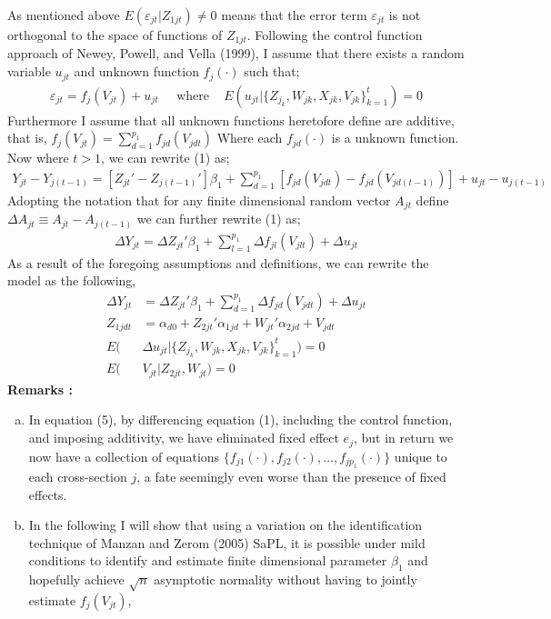 \documentclass[10pt]{article}
\begin{document}
 \noindent 
As mentioned above $E(\varepsilon_{jt} | Z_{1jt} ) \neq 0$ means that the error term $\varepsilon_{jt}$ is not orthogonal to the space of functions of $Z_{1jt}$. Following the control function approach of Newey, Powell, and Vella (1999), I assume that there exists a random variable $u_{jt}$ and unknown function $f_j(\cdot)$ such that; 
 \begin{align*} 
 \varepsilon_{jt} = f_j(V_{jt}) + u_{jt}  \;\;\;\ \text{ where } \;\;\; E(u_{jt} | \{Z_{j_k},W_{jk},X_{jk},V_{jk} \}_{k=1}^t) = 0
 \end{align*}
 Furthermore I assume that all unknown functions heretofore define are additive, that is, $f_j(V_{jt}) = \sum_{d=1}^{p_1} f_{jd}(V_{jdt})$
%
Where each $f_{jd}(\cdot)$ is a unknown function. 
Now where $t>1$, we can rewrite (1) as;
\begin{align*} 
Y_{jt} - Y_{j(t-1)} = [ Z_{jt}' - Z_{j(t-1)}' ]\beta_1 +  \sum_{d=1}^{p_1} [ f_{jd}(V_{jdt}) - f_{jd}(V_{jd(t-1)})] + u_{jt} - u_{j(t-1)}
\end{align*}
Adopting the notation that for any finite dimensional random vector $A_{jt}$ define $\Delta A_{jt}  \equiv A_{jt} - A_{j(t-1)}$ we can further rewrite (1) as;
\begin{align*} 
\Delta Y_{jt} = \Delta Z_{jt}'\beta_1  + \sum_{l=1}^{p_1} \Delta f_{jl}(V_{jlt}) + \Delta u_{jt}
\end{align*}
As a result of the foregoing assumptions and definitions, we can rewrite the model as the following, 
\begin{align} 
\Delta Y_{jt} &= \Delta Z_{jt}'\beta_1 + \sum_{d=1}^{p_1} \Delta f_{jd}(V_{jdt}) + \Delta u_{jt} \\
%
Z_{1jdt} &= \alpha_{d0} + Z_{2jt}' \alpha_{1jd} + W_{jt}' \alpha_{2jd} + V_{jdt} \tag{2d}\\
%
E(&\Delta u_{jt} | \{Z_{j_k},W_{jk},X_{jk},V_{jk} \}_{k=1}^t) = 0 \\
%
E(& V_{jt} | Z_{2jt},W_{jt}) = 0 
%
\end{align}
%
\noindent \bf Remarks \rm:
\begin{enumerate}[a.)] 
    \item In equation (5), by differencing equation (1), including the control function, and imposing additivity, we have eliminated fixed effect $e_j$, but in return we now have a collection of equations $\{f_{j1}(\cdot),f_{j2}(\cdot), \ldots , f_{jp_1}(\cdot)\}$ unique to each cross-section $j$, a fate seemingly even worse than the presence of fixed effects. 
    \item In the following I will show that using a variation on the identification technique of Manzan and Zerom (2005) SaPL, it is possible under mild conditions to identify and estimate finite dimensional parameter $\beta_1$  and hopefully achieve $\sqrt{n}$ asymptotic normality  without having to jointly estimate $f_j(V_{jt})$,  
\end{enumerate}
\end{document}
